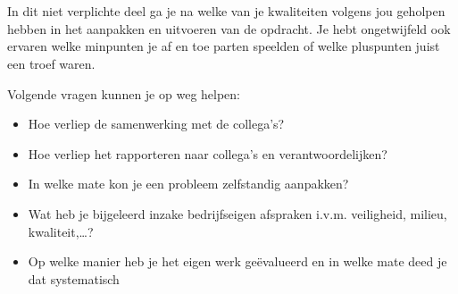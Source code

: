 


\chapter*{}%
\label{ch:nawoord}

In dit niet verplichte deel ga je na welke van je kwaliteiten volgens jou geholpen hebben in het aanpakken en
uitvoeren van de opdracht. Je hebt ongetwijfeld ook ervaren welke minpunten je af en toe parten speelden
of welke pluspunten juist een troef waren. 

Volgende vragen kunnen je op weg helpen:
\begin{itemize}[]
    \item Hoe verliep de samenwerking met de collega’s?
    \item Hoe verliep het rapporteren naar collega’s en verantwoordelijken?
    \item In welke mate kon je een probleem zelfstandig aanpakken?
    \item Wat heb je bijgeleerd inzake bedrijfseigen afspraken i.v.m. veiligheid, milieu, kwaliteit,…?
    \item Op welke manier heb je het eigen werk geëvalueerd en in welke mate deed je dat systematisch
\end{itemize}